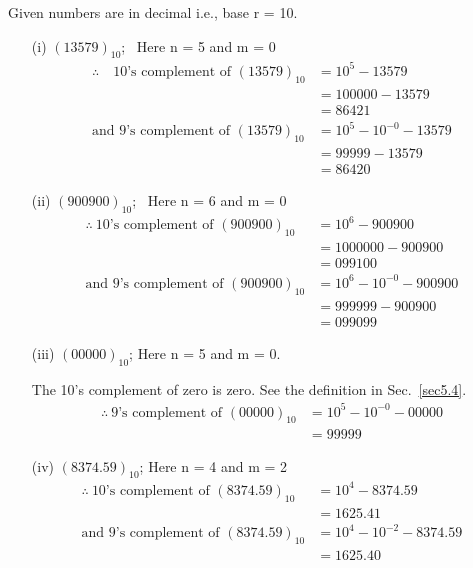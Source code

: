\begin{solution}
Given numbers are in decimal i.e., base r = 10.
\begin{itemize}
\item[(i)] $(13579)_{10}$\qquad ;~ Here n = 5 and m = 0
\begin{align*}
\therefore\quad \text{10's complement of } (13579)_{10} &= 10^{5}-13579\\[3pt]
&= 100000-13579\\[3pt]
&= 86421\\[3pt]
\text{and 9's complement of } (13579)_{10} &= 10^{5}-10^{-0}-13579\\[3pt]
&= 99999-13579\\[3pt]
&= 86420
\end{align*}

\item[(ii)] $(900900)_{10}$\qquad ;~ Here n = 6 and m = 0
\begin{align*}
\therefore~ \text{10's complement of } (900900)_{10} &= 10^{6}-900900\\[3pt]
&= 1000000 - 900900\\[3pt]
&= 099100\\[3pt]
\text{and 9's complement of } (900900)_{10} &= 10^{6}-10^{-0}-900900\\[3pt]
 &= 999999-900900\\[3pt]
 &= 099099
\end{align*}

\item[(iii)] $(00000)_{10}$\qquad ; Here n = 5 and m = 0.

The 10's complement of zero is zero. See the definition in Sec.~\ref{sec5.4}.
\begin{align*}
\therefore~ \text{9's complement of } (00000)_{10} &= 10^{5}-10^{-0}-00000\\[3pt]
                                                  &= 99999
\end{align*}

\item[(iv)] $(8374.59)_{10}$\qquad ; Here n = 4 and m = 2
\begin{align*}
\therefore~ \text{10's complement of } (8374.59)_{10} &= 10^{4}-8374.59\\[3pt]
&= 1625.41\\[3pt]
\text{and 9's complement of } (8374.59)_{10} &= 10^{4}-10^{-2}-8374.59\\[3pt]
&= 1625.40
\end{align*}


\end{itemize}
\end{solution}
